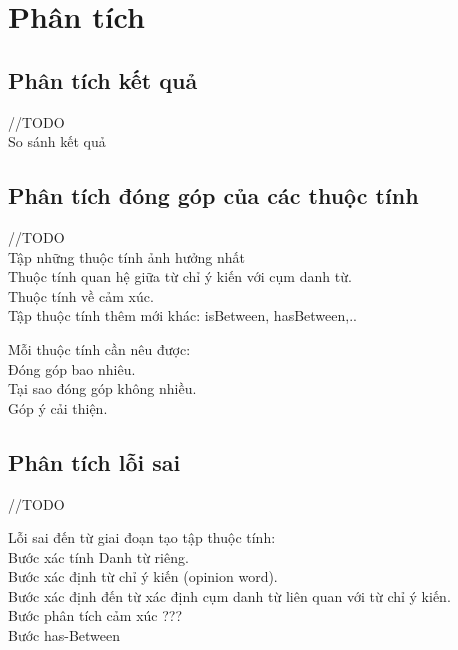 \documentclass[12pt]{report}
\begin{document}
		\section{Phân tích}
			\subsection*{Phân tích kết quả}
			//TODO
			\\So sánh kết quả
			\subsection*{Phân tích đóng góp của các thuộc tính}
			//TODO
			\\Tập những thuộc tính ảnh hưởng nhất
			\\Thuộc tính quan hệ giữa từ chỉ ý kiến với cụm danh từ.
			\\Thuộc tính về cảm xúc.
			\\Tập thuộc tính thêm mới khác: isBetween, hasBetween,..
			\par Mỗi thuộc tính cần nêu được:
			\\Đóng góp bao nhiêu.
			\\Tại sao đóng góp không nhiều.
			\\Góp ý cải thiện.
			\subsection*{Phân tích lỗi sai}
			//TODO
			\par Lỗi sai đến từ giai đoạn tạo tập thuộc tính:
				\\Bước xác tính Danh từ riêng.
				\\Bước xác định từ chỉ ý kiến (opinion word).
				\\Bước xác định đến từ xác định cụm danh từ liên quan với từ chỉ ý kiến.
				\\Bước phân tích cảm xúc ???
				\\Bước has-Between
		
\end{document}
